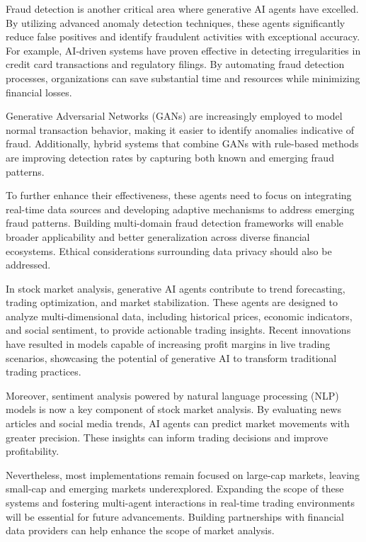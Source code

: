 \documentclass[a4paper,headinclude=on,footinclude=on,12pt,oneside]{scrbook}
\begin{document}
	Fraud detection is another critical area where generative AI agents have excelled. By utilizing advanced anomaly detection techniques, these agents significantly reduce false positives and identify fraudulent activities with exceptional accuracy. For example, AI-driven systems have proven effective in detecting irregularities in credit card transactions and regulatory filings. By automating fraud detection processes, organizations can save substantial time and resources while minimizing financial losses.
	
	Generative Adversarial Networks (GANs) are increasingly employed to model normal transaction behavior, making it easier to identify anomalies indicative of fraud. Additionally, hybrid systems that combine GANs with rule-based methods are improving detection rates by capturing both known and emerging fraud patterns.
	
	To further enhance their effectiveness, these agents need to focus on integrating real-time data sources and developing adaptive mechanisms to address emerging fraud patterns. Building multi-domain fraud detection frameworks will enable broader applicability and better generalization across diverse financial ecosystems. Ethical considerations surrounding data privacy should also be addressed.
	
	
	In stock market analysis, generative AI agents contribute to trend forecasting, trading optimization, and market stabilization. These agents are designed to analyze multi-dimensional data, including historical prices, economic indicators, and social sentiment, to provide actionable trading insights. Recent innovations have resulted in models capable of increasing profit margins in live trading scenarios, showcasing the potential of generative AI to transform traditional trading practices.
	
	Moreover, sentiment analysis powered by natural language processing (NLP) models is now a key component of stock market analysis. By evaluating news articles and social media trends, AI agents can predict market movements with greater precision. These insights can inform trading decisions and improve profitability.
	
	Nevertheless, most implementations remain focused on large-cap markets, leaving small-cap and emerging markets underexplored. Expanding the scope of these systems and fostering multi-agent interactions in real-time trading environments will be essential for future advancements. Building partnerships with financial data providers can help enhance the scope of market analysis.
	
\end{document}
